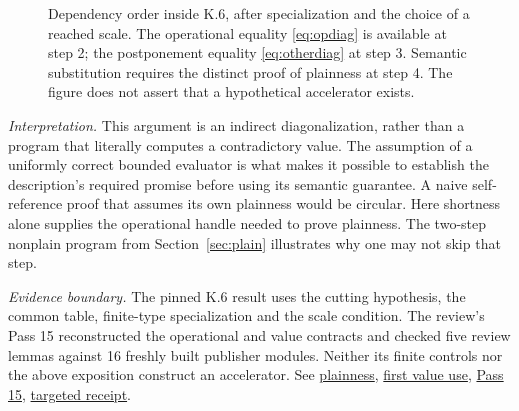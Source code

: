 \documentclass[11pt,letterpaper]{article}
\theoremstyle{definition}\newtheorem{definition}[theorem]{Definition}\newtheorem{example}[theorem]{Example}
\theoremstyle{remark}\newtheorem{remark}[theorem]{Remark}
\newcommand{\pub}[3]{\href{https://github.com/anthropics/formal-math/blob/11b6c7e3c927df2658f513b6b68ea7f8929c62c5/vp-vnp/#1\#L#2}{#3}}
\newcommand{\aud}[2]{\href{https://github.com/nousentllc/VP-VNP-Review/blob/567303d0bcf4f9d54390437b137752446e58ccd6/#1}{#2}}
\newcommand{\scope}[1]{\par\smallskip\noindent\textit{Evidence boundary.} #1\par\smallskip}
\newcommand{\interpret}[1]{\par\smallskip\noindent\textit{Interpretation.} #1\par\smallskip}
\begin{document}
\begin{figure}[!htbp]
\centering
{}
\caption{Dependency order inside K.6, after specialization and the choice of a reached scale. The operational equality \eqref{eq:opdiag} is available at step 2; the postponement equality \eqref{eq:otherdiag} at step 3. Semantic substitution requires the distinct proof of plainness at step 4. The figure does not assert that a hypothetical accelerator exists.}\label{fig:diagonal-order}
\end{figure}

\interpret{This argument is an indirect diagonalization, rather than a program that literally computes a contradictory value. The assumption of a uniformly correct bounded evaluator is what makes it possible to establish the description's required promise before using its semantic guarantee. A naive self-reference proof that assumes its own plainness would be circular. Here shortness alone supplies the operational handle needed to prove plainness. The two-step nonplain program from Section~\ref{sec:plain} illustrates why one may not skip that step.}
\scope{The pinned K.6 result uses the cutting hypothesis, the common table, finite-type specialization and the scale condition. The review's Pass 15 reconstructed the operational and value contracts and checked five review lemmas against 16 freshly built publisher modules. Neither its finite controls nor the above exposition construct an accelerator. See \pub{Paper/NoAcc.lean}{188}{plainness}, \pub{Paper/NoAcc.lean}{216}{first value use}, \aud{passes/15-diagonal.md}{Pass 15}, \aud{checks/pass15_lean.json}{targeted receipt}.}
\end{document}
